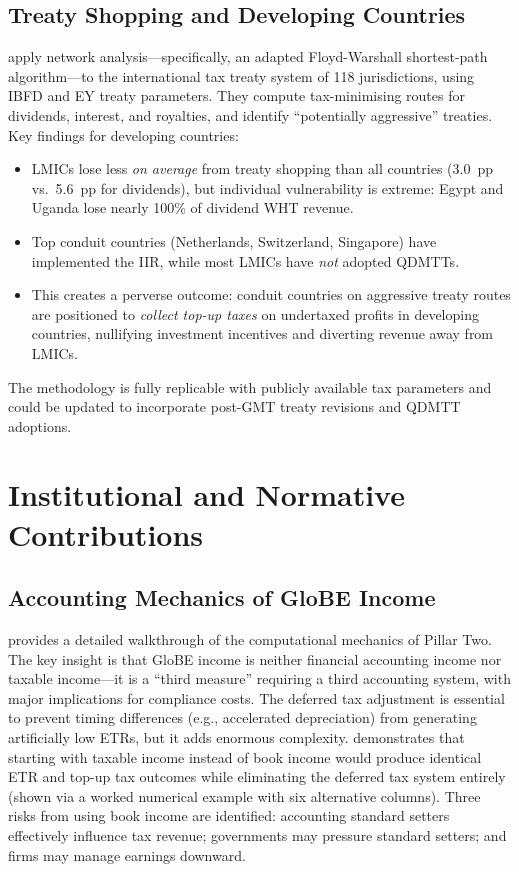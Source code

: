 \documentclass[11pt,a4paper]{article}
\begin{document}
\subsection{Treaty Shopping and Developing Countries}
\label{subsec:vantriet}

\citet{vantriet2025} apply network analysis---specifically, an adapted Floyd-Warshall shortest-path algorithm---to the international tax treaty system of 118 jurisdictions, using IBFD and EY treaty parameters. They compute tax-minimising routes for dividends, interest, and royalties, and identify ``potentially aggressive'' treaties. Key findings for developing countries:
\begin{itemize}[nosep]
    \item LMICs lose less \emph{on average} from treaty shopping than all countries (3.0~pp vs.\ 5.6~pp for dividends), but individual vulnerability is extreme: Egypt and Uganda lose nearly 100\% of dividend WHT revenue.
    \item Top conduit countries (Netherlands, Switzerland, Singapore) have implemented the IIR, while most LMICs have \emph{not} adopted QDMTTs.
    \item This creates a perverse outcome: conduit countries on aggressive treaty routes are positioned to \emph{collect top-up taxes} on undertaxed profits in developing countries, nullifying investment incentives and diverting revenue away from LMICs.
\end{itemize}
The methodology is fully replicable with publicly available tax parameters and could be updated to incorporate post-GMT treaty revisions and QDMTT adoptions.


\section{Institutional and Normative Contributions}
\label{sec:institutional}


\subsection{Accounting Mechanics of GloBE Income}
\label{subsec:hanlon}

\citet{hanlon2023} provides a detailed walkthrough of the computational mechanics of Pillar Two. The key insight is that GloBE income is neither financial accounting income nor taxable income---it is a ``third measure'' requiring a third accounting system, with major implications for compliance costs. The deferred tax adjustment is essential to prevent timing differences (e.g., accelerated depreciation) from generating artificially low ETRs, but it adds enormous complexity. \citeauthor{hanlon2023} demonstrates that starting with taxable income instead of book income would produce identical ETR and top-up tax outcomes while eliminating the deferred tax system entirely (shown via a worked numerical example with six alternative columns). Three risks from using book income are identified: accounting standard setters effectively influence tax revenue; governments may pressure standard setters; and firms may manage earnings downward.
\end{document}
